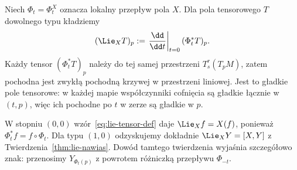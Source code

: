 \begin{definicja}
\label{def:lie-tensor}
Niech $\Phi_t=\Phi_t^X$ oznacza lokalny przepływ pola $X$.
Dla pola tensorowego $T$ dowolnego typu kładziemy
\begin{equation}\label{eq:lie-tensor-def}
 (\Lie_XT)_p
 :=\left.\frac{\dd}{\dd t}\right|_{t=0}
 (\Phi_t^*T)_p.
\end{equation}
Każdy tensor $(\Phi_t^*T)_p$ należy do tej samej
przestrzeni $T^r_s(T_pM)$, zatem pochodna jest
zwykłą pochodną krzywej w przestrzeni liniowej. Jest to gładkie
pole tensorowe: w każdej mapie współczynniki cofnięcia są gładkie
łącznie w $(t,p)$, więc ich pochodne po $t$ w zerze są gładkie w $p$.
\end{definicja}

W stopniu $(0,0)$ wzór~\eqref{eq:lie-tensor-def} daje
$\Lie_Xf=X(f)$, ponieważ $\Phi_t^*f=f\circ\Phi_t$.
Dla typu $(1,0)$ odzyskujemy dokładnie
$\Lie_XY=[X,Y]$ z Twierdzenia~\ref{thm:lie-nawias}.
Dowód tamtego twierdzenia wyjaśnia szczegółowo znak:
przenosimy $Y_{\Phi_t(p)}$ z powrotem różniczką
przepływu $\Phi_{-t}$.


